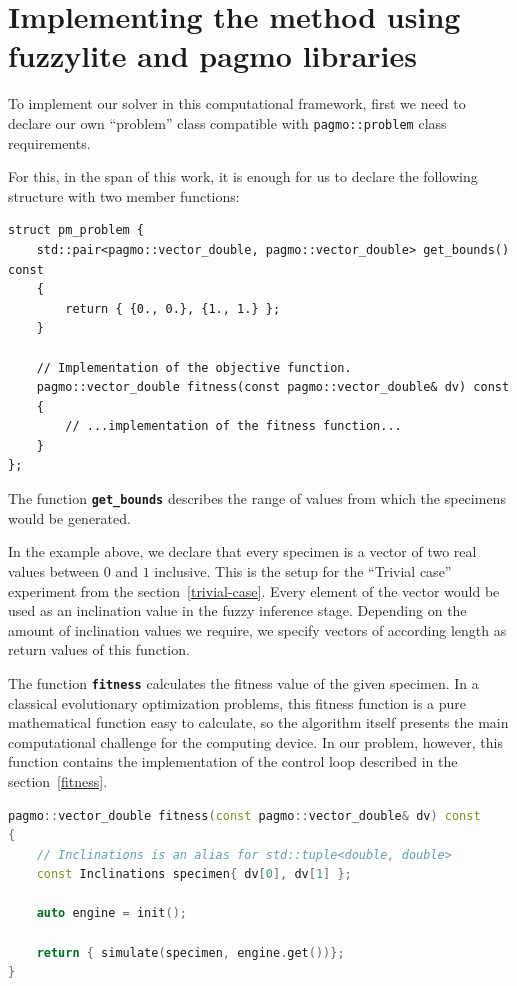 \documentclass[12pt, a4paper]{report}
\begin{document}
	\section{Implementing the method using fuzzylite and pagmo libraries}\label{section::implementation}
	
	To implement our solver in this computational framework, first we need to declare our own ``problem'' class compatible with \texttt{pagmo::problem} class requirements.
	
	For this, in the span of this work, it is enough for us to declare the following structure with two member functions:
	
	\begin{lstlisting}[language={[11]c++}]
struct pm_problem {
	std::pair<pagmo::vector_double, pagmo::vector_double> get_bounds() const
	{
		return { {0., 0.}, {1., 1.} };
	}
	
	// Implementation of the objective function.
	pagmo::vector_double fitness(const pagmo::vector_double& dv) const
	{
		// ...implementation of the fitness function...
	}
};
	\end{lstlisting}
	
	The function \textbf{\texttt{get\_bounds}} describes the range of values from which the specimens would be generated.
	
	In the example above, we declare that every specimen is a vector of two real values between $0$ and $1$ inclusive.
	This is the setup for the ``Trivial case'' experiment from the section~\ref{trivial-case}.
	Every element of the vector would be used as an inclination value in the fuzzy inference stage.
	Depending on the amount of inclination values we require, we specify vectors of according length as return values of this function.
	
	The function \textbf{\texttt{fitness}} calculates the fitness value of the given specimen.
	In a classical evolutionary optimization problems, this fitness function is a pure mathematical function easy to calculate, so the algorithm itself presents the main computational challenge for the computing device.
	In our problem, however, this function contains the implementation of the control loop described in the section~\ref{fitness}.
	
	\begin{lstlisting}[language=c++]
pagmo::vector_double fitness(const pagmo::vector_double& dv) const
{
	// Inclinations is an alias for std::tuple<double, double>
	const Inclinations specimen{ dv[0], dv[1] };
	
	auto engine = init();
	
	return { simulate(specimen, engine.get())};
}
	\end{lstlisting}
	
\end{document}
